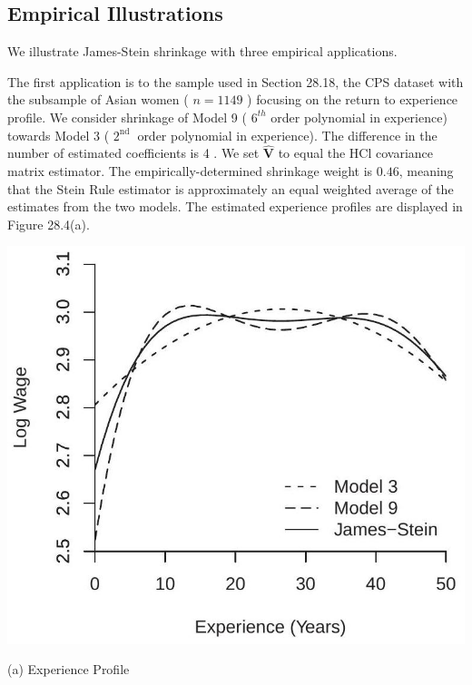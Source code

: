 \documentclass[10pt]{article}
\begin{document}
\subsection{Empirical Illustrations}
We illustrate James-Stein shrinkage with three empirical applications.

The first application is to the sample used in Section 28.18, the CPS dataset with the subsample of Asian women ( $n=1149$ ) focusing on the return to experience profile. We consider shrinkage of Model 9 ( $6^{t h}$ order polynomial in experience) towards Model 3 ( $2^{\text {nd }}$ order polynomial in experience). The difference in the number of estimated coefficients is 4 . We set $\widehat{\boldsymbol{V}}$ to equal the $\mathrm{HCl}$ covariance matrix estimator. The empirically-determined shrinkage weight is $0.46$, meaning that the Stein Rule estimator is approximately an equal weighted average of the estimates from the two models. The estimated experience profiles are displayed in Figure 28.4(a).

\includegraphics[max width=\textwidth]{2022_10_23_101d59f261a704807a3bg-33}

(a) Experience Profile
\end{document}
